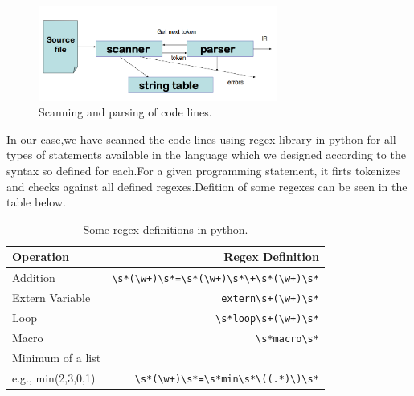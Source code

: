 \documentclass[12pt]{article}
\begin{document}
\begin{figure}[!htb]
\centering
\includegraphics[width=0.7\textwidth]{scanning-and-parsing.png}
\caption{\label{fig:sc_pa}Scanning and parsing of code lines.}
\end{figure}
In our case,we have scanned the code lines using regex library in python for all types of statements available in the language which we designed according to the syntax so defined for each.For a given programming statement, it firts tokenizes and checks against all defined regexes.Defition of some regexes can be seen in the table below.
\begin{table}[!htb]
\centering
\begin{tabular}{l|r}
Operation & Regex Definition \\\hline
Addition &  \verb|\s*(\w+)\s*=\s*(\w+)\s*\+\s*(\w+)\s*|  \\
Extern Variable &    \verb|extern\s+(\w+)\s*|   \\
Loop &    \verb|\s*loop\s+(\w+)\s*|   \\
Macro  &    \verb|\s*macro\s*|   \\
Minimum of a list\\    e.g., min(2,3,0,1) & \verb|\s*(\w+)\s*=\s*min\s*\((.*)\)\s*|
\end{tabular}
\caption{\label{tab:regex}Some regex definitions in python.}
\end{table}
\end{document}

